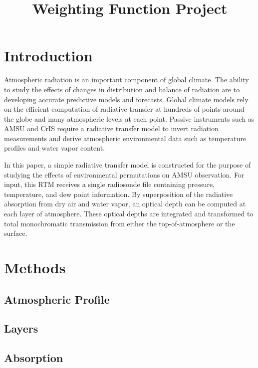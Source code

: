 \documentclass[twocol]{ametsoc}
\title{Weighting Function Project}
\affiliation{University of Wisconsin - Madison}
\begin{document}
\maketitle


%
\section{Introduction}

Atmospheric radiation is an important component of global climate.
The ability to study the effects of changes in distribution and balance of radiation are to developing accurate predictive models and forecasts.
Global climate models rely on the efficient computation of radiative transfer at hundreds of points around the globe and many atmospheric levels at each point.
Passive instruments such as AMSU and CrIS require a radiative transfer model to invert radiation measurements and derive atmospheric environmental data such as temperature profiles and water vapor content.
\par In this paper, a simple radiative transfer model is constructed for the purpose of studying the effects of environmental permutations on AMSU observation.
For input, this RTM receives a  single radiosonde file containing pressure, temperature, and dew point information.
By superposition of the radiative absorption from dry air and water vapor, an optical depth can be computed at each layer of atmosphere.
These optical depths are integrated and transformed to total monochromatic transmission from either the top-of-atmosphere or the surface.

\section{Methods}

\subsection{Atmospheric Profile}

\subsection{Layers}

\subsection{Absorption}
\end{document}

